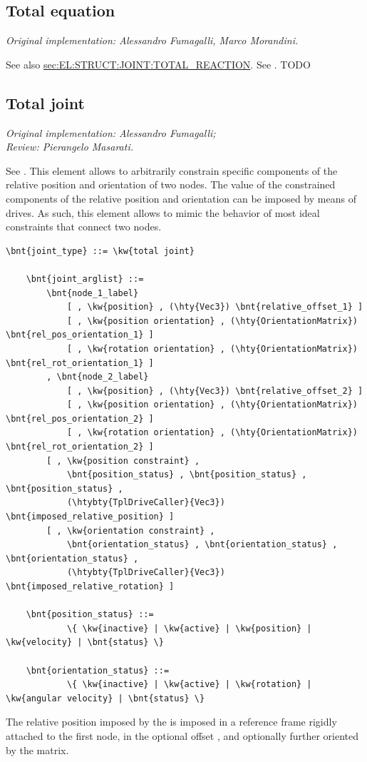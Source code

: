 \subsection{Total equation}
\label{sec:EL:STRUCT:JOINT:TOTAL_EQUATION}
\emph{Original implementation: Alessandro Fumagalli, Marco Morandini.}

See also
\hyperref{\kw{total reaction}}{\kw{total reaction} (see Section~}{)}{sec:EL:STRUCT:JOINT:TOTAL_REACTION}.
See \cite{FUMAGALLI-CND-2011}.
TODO



\subsection{Total joint}
\label{sec:EL:STRUCT:JOINT:TOTAL_JOINT}
\emph{Original implementation: Alessandro Fumagalli; \\
Review: Pierangelo Masarati.}

See \cite{MASARATI-TOTALJ}.
This element allows to arbitrarily constrain specific components
of the relative position and orientation of two nodes.
The value of the constrained components of the relative position
and orientation can be imposed by means of drives.
As such, this element allows to mimic the behavior of most
ideal constraints that connect two nodes.
\begin{Verbatim}[commandchars=\\\{\}]
    \bnt{joint_type} ::= \kw{total joint}

    \bnt{joint_arglist} ::=
        \bnt{node_1_label}
            [ , \kw{position} , (\hty{Vec3}) \bnt{relative_offset_1} ]
            [ , \kw{position orientation} , (\hty{OrientationMatrix}) \bnt{rel_pos_orientation_1} ]
            [ , \kw{rotation orientation} , (\hty{OrientationMatrix}) \bnt{rel_rot_orientation_1} ]
        , \bnt{node_2_label}
            [ , \kw{position} , (\hty{Vec3}) \bnt{relative_offset_2} ]
            [ , \kw{position orientation} , (\hty{OrientationMatrix}) \bnt{rel_pos_orientation_2} ]
            [ , \kw{rotation orientation} , (\hty{OrientationMatrix}) \bnt{rel_rot_orientation_2} ]
        [ , \kw{position constraint} ,
            \bnt{position_status} , \bnt{position_status} , \bnt{position_status} ,
            (\htybty{TplDriveCaller}{Vec3}) \bnt{imposed_relative_position} ]
        [ , \kw{orientation constraint} ,
            \bnt{orientation_status} , \bnt{orientation_status} , \bnt{orientation_status} ,
            (\htybty{TplDriveCaller}{Vec3}) \bnt{imposed_relative_rotation} ]

    \bnt{position_status} ::=
            \{ \kw{inactive} | \kw{active} | \kw{position} | \kw{velocity} | \bnt{status} \}

    \bnt{orientation_status} ::=
            \{ \kw{inactive} | \kw{active} | \kw{rotation} | \kw{angular velocity} | \bnt{status} \}
\end{Verbatim}
The relative position imposed by the 
is imposed in a reference frame rigidly attached to the first node,
in the optional offset ,
and optionally further oriented by the 
matrix.

